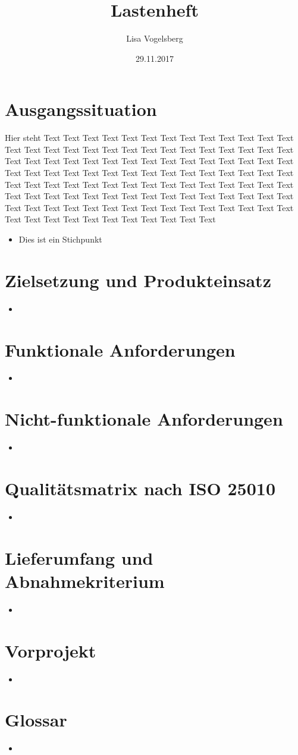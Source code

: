 \documentclass[11pt,a4paper]{scrreprt}
\title{Lastenheft}
\author{Lisa Vogelsberg}
\date{29.11.2017}
\begin{document}
\tableofcontents
\chapter{Ausgangssituation}
Hier steht Text Text Text Text Text Text Text Text Text Text Text Text Text Text Text Text Text Text Text Text Text Text Text Text Text Text Text Text Text Text Text Text Text Text Text Text Text Text Text Text Text Text Text Text Text Text Text Text Text Text Text Text Text Text Text Text Text Text Text Text Text Text Text Text Text Text Text Text Text Text Text Text Text Text Text Text Text Text Text Text Text Text Text Text Text Text Text Text Text Text Text Text Text Text Text Text Text Text Text Text Text Text Text Text Text Text Text Text Text Text Text Text Text Text
\begin{itemize}
\item Dies ist ein Stichpunkt
\end{itemize}
\chapter{Zielsetzung und Produkteinsatz}
\begin{itemize}
\item
\end{itemize}
\chapter{Funktionale Anforderungen}
\begin{itemize}
\item
\end{itemize}
\chapter{Nicht-funktionale Anforderungen}
\begin{itemize}
\item
\end{itemize}
\chapter{Qualitätsmatrix nach ISO 25010}
\begin{itemize}
\item
\end{itemize}
\chapter{Lieferumfang und Abnahmekriterium}
\begin{itemize}
\item
\end{itemize}
\chapter{Vorprojekt}
\begin{itemize}
\item
\end{itemize}
\chapter{Glossar}
\begin{itemize}
\item
\end{itemize}
\end{document}
